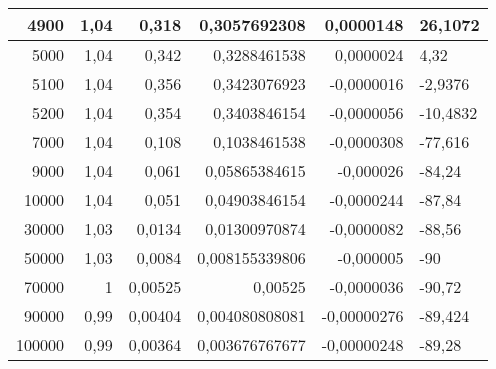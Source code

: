 \documentclass{article}
\begin{document}
\begin{table}[!h]
\begin{tabular}{|r|r|r|r|r|l|}
4900                                 & 1,04                          & 0,318                            & 0,3057692308               & 0,0000148                          & 26,1072  \\ \hline
5000                                 & 1,04                          & 0,342                            & 0,3288461538               & 0,0000024                          & 4,32     \\ \hline
5100                                 & 1,04                          & 0,356                            & 0,3423076923               & -0,0000016                         & -2,9376  \\ \hline
5200                                 & 1,04                          & 0,354                            & 0,3403846154               & -0,0000056                         & -10,4832 \\ \hline
7000                                 & 1,04                          & 0,108                            & 0,1038461538               & -0,0000308                         & -77,616  \\ \hline
9000                                 & 1,04                          & 0,061                            & 0,05865384615              & -0,000026                          & -84,24   \\ \hline
10000                                & 1,04                          & 0,051                            & 0,04903846154              & -0,0000244                         & -87,84   \\ \hline
30000                                & 1,03                          & 0,0134                           & 0,01300970874              & -0,0000082                         & -88,56   \\ \hline
50000                                & 1,03                          & 0,0084                           & 0,008155339806             & -0,000005                          & -90      \\ \hline
70000                                & 1                             & 0,00525                          & 0,00525                    & -0,0000036                         & -90,72   \\ \hline
90000                                & 0,99                          & 0,00404                          & 0,004080808081             & -0,00000276                        & -89,424  \\ \hline
100000                               & 0,99                          & 0,00364                          & 0,003676767677             & -0,00000248                        & -89,28   \\ \hline

\end{tabular}
\end{table}
\end{document}
